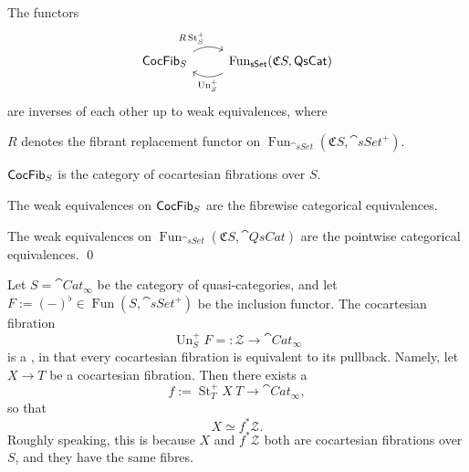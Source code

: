 \begin{corollary}
    The functors 
    \[\begin{tikzcd}
        \smash{\cat{CocFib}_{\/S}}\vphantom{1_1}\ar[r,bend left,start anchor=north east,end anchor=north west,"R\operatorname{St}_S^+"] &
        \operatorname{Fun}_{\cat{sSet}}(\mathfrak CS,\cat{QsCat})\ar[l,bend left,start anchor=south west,end anchor=south east,"\operatorname{Un}_S^+"]
    \end{tikzcd}\]
    are inverses of each other up to weak equivalences, where 
    \begin{itms}
        \item $R$ denotes the fibrant replacement functor on
        $\operatorname{Fun}_{\cat{sSet}}(\mathfrak CS,\cat{sSet}^+)$.
        \item $\textup{\textsf{CocFib}}_{\/S}$ is the category of cocartesian fibrations over $S$.
        \item The weak equivalences on $\textup{\textsf{CocFib}}_{\/S}$
        are the fibrewise categorical equivalences.
        \item The weak equivalences on 
        $\operatorname{Fun}_{\cat{sSet}}(\mathfrak CS,\cat{QsCat})$
        are the pointwise categorical equivalences. \qed
    \end{itms}
\end{corollary}

\begin{example}
    Let $S=\cat{Cat}_\infty$ be the category of quasi-categories,
    and let $F:=(-)^\flat\in\operatorname{Fun}(S,\cat{sSet}^+)$
    be the inclusion functor.
    The cocartesian fibration 
    \[ \operatorname{Un}_S^+F=:\mathscr Z\to\cat{Cat}_\infty \]
    is a , in that every cocartesian fibration 
    is equivalent to its pullback.
    Namely, let $X\to T$ be a cocartesian fibration.
    Then there exists a 
    \[ f:=\operatorname{St}_T^+X\:T\to\cat{Cat}_\infty, \]
    so that 
    \[ X\simeq f^*\mathscr Z. \]
    Roughly speaking, this is because
    $X$ and $f^*\mathscr Z$ both are cocartesian fibrations over $S$,
    and they have the same fibres.
    \varqed
\end{example}
